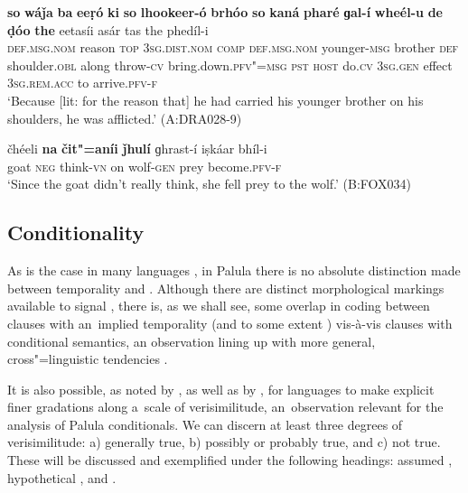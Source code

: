 \begin{exe}
\ex
\label{ex:13-92}
\gll \textbf{so} \textbf{wáǰa} \textbf{ba} \textbf{eeṛó} \textbf{ki} \textbf{so} \textbf{lhookeer-ó} \textbf{brhóo} \textbf{so} \textbf{kaná} \textbf{pharé} \textbf{ɡal-í} \textbf{wheél-u} \textbf{de} \textbf{ḍóo} \textbf{the} eetasíi asár tas the phedíl-i \\
\textsc{def.msg.nom} reason \textsc{top} \textsc{3sg.dist.nom} \textsc{comp} \textsc{def.msg.nom} younger-\textsc{msg} brother \textsc{def}{\protect\footnotemark} shoulder.\textsc{obl} along throw-\textsc{cv} bring.down.\textsc{pfv"=msg} \textsc{pst} \textsc{host} do.\textsc{cv}  \textsc{3sg.gen} effect \textsc{3sg.rem.acc} to arrive.\textsc{pfv-f} \\
\glt `Because [lit: for the reason that] he had carried his younger brother on his shoulders, he was afflicted.' (A:DRA028-9)

\ex
\label{ex:13-93}
\gll čhéeli \textbf{na} \textbf{čit"=aníi} \textbf{ǰhulí} ɡhrast-í iṣkáar bhíl-i \\
goat \textsc{neg} think-\textsc{vn} on wolf-\textsc{gen} prey become.\textsc{pfv-f}  \\
\glt `Since the goat didn't really think, she fell prey to the wolf.' (B:FOX034)
\end{exe}


\subsection{Conditionality}
\label{subsec:13-4-4}

As is the case in many languages \citep[257--258]{thompsonetal2007}, in Palula there is no absolute distinction made between temporality and . Although there are distinct morphological markings available to signal , there is, as we shall see, some overlap in coding between clauses with an~implied temporality (and to some extent ) vis-à-vis clauses with conditional semantics, an observation lining up with more general, cross"=linguistic tendencies \citep[161]{cristofaro2005}.



It is also possible, as noted by \citet[255--260]{thompsonetal2007}, as well as by \citet[333--334]{givon2001b}, for languages to make explicit finer gradations along a~scale of verisimilitude, an~observation relevant for the analysis of Palula conditionals. We can discern at least three degrees of verisimilitude: a) generally true, b) possibly or probably true, and c) not true. These will be discussed and exemplified under the following headings: assumed , hypothetical , and .



